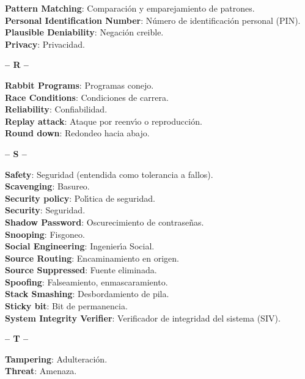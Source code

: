 {\bf Pattern Matching}: Comparaci\'on y emparejamiento de patrones.\\
{\bf Personal Identification Number}: N\'umero de identificaci\'on personal (PIN).\\
{\bf Plausible Deniability}: Negaci\'on creible.\\
{\bf Privacy}: Privacidad.\\
\begin{center}
{\large {\bf -- R --}}\\
\end{center}
{\bf Rabbit Programs}: Programas conejo.\\
{\bf Race Conditions}: Condiciones de carrera.\\
{\bf Reliability}: Confiabilidad.\\
{\bf Replay attack}: Ataque por reenv\'{\i}o o reproducci\'on.\\
{\bf Round down}: Redondeo hacia abajo.\\
\begin{center}
{\large {\bf -- S --}}\\
\end{center}
{\bf Safety}: Seguridad (entendida como tolerancia a fallos).\\
{\bf Scavenging}: Basureo.\\
{\bf Security policy}: Pol\'{\i}tica de seguridad.\\
{\bf Security}: Seguridad.\\
{\bf Shadow Password}: Oscurecimiento de contrase\~nas.\\
{\bf Snooping}: Fisgoneo.\\
{\bf Social Engineering}: Ingenier\'{\i}a Social.\\ 
{\bf Source Routing}: Encaminamiento en origen.\\
{\bf Source Suppressed}: Fuente eliminada.\\
{\bf Spoofing}: Falseamiento, enmascaramiento.\\
{\bf Stack Smashing}: Desbordamiento de pila.\\
{\bf Sticky bit}: Bit de permanencia.\\
{\bf System Integrity Verifier}: Verificador de integridad del sistema (SIV).\\
\begin{center}
{\large {\bf -- T --}}\\
\end{center}
{\bf Tampering}: Adulteraci\'on.\\
{\bf Threat}: Amenaza.\\
